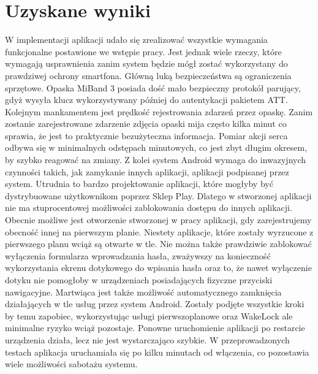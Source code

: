 \section{Uzyskane wyniki}
W implementacji aplikacji udało się zrealizować wszystkie wymagania funkcjonalne postawione we wstępie pracy. Jest jednak wiele rzeczy, które wymagają usprawnienia zanim system będzie mógł zostać wykorzystany do prawdziwej ochrony smartfona. Główną luką bezpieczeństwa są ograniczenia sprzętowe. 
\newline\newline
\indent Opaska MiBand 3 posiada dość mało bezpieczny protokół parujący, gdyż wysyła klucz wykorzystywany później do autentykacji pakietem ATT. Kolejnym mankamentem jest prędkość rejestrowania zdarzeń przez opaskę. Zanim zostanie zarejestrowane zdarzenie zdjęcia opaski mija często kilka minut co sprawia, że jest to praktycznie bezużyteczna informacja. Pomiar akcji serca odbywa się w minimalnych  odstępach minutowych, co jest zbyt długim okresem, by szybko reagować na zmiany. 
\newline\newline
\indent Z kolei system Android wymaga do inwazyjnych czynności takich, jak zamykanie innych aplikacji, aplikacji podpisanej przez system. Utrudnia to bardzo projektowanie aplikacji, które mogłyby być dystrybuowane użytkownikom poprzez Sklep Play. Dlatego w stworzonej aplikacji nie ma stuprocentowej możliwości zablokowania dostępu do innych aplikacji. Obecnie możliwe jest otworzenie stworzonej w pracy aplikacji, gdy zarejestrujemy obecność innej na pierwszym planie. Niestety aplikacje, które zostały wyrzucone z pierwszego planu wciąż są otwarte w tle. Nie można także prawdziwie zablokować wyłączenia formularza wprowadzania hasła, zważywszy na konieczność wykorzystania ekrenu dotykowego do wpisania hasła oraz to, że nawet wyłączenie dotyku nie pomogłoby w urządzeniach posiadających fizyczne przyciski nawigacyjne. Martwiąca jest także możliwość automatycznego zamknięcia działających w tle usług przez system Android. Zostały podjęte wszystkie kroki by temu zapobiec, wykorzystując usługi pierwszoplanowe oraz WakeLock ale minimalne ryzyko wciąż pozostaje. Ponowne uruchomienie aplikacji po restarcie urządzenia działa, lecz nie jest wystarczająco szybkie. W przeprowadzonych testach aplikacja uruchamiała się po kilku minutach od włączenia, co pozostawia wiele możliwości sabotażu systemu.
